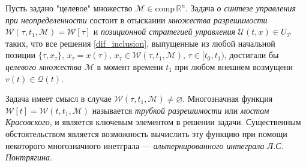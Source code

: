 Пусть задано "целевое" множество \( \mathcal{M} \in \text{comp} \, \mathbb{R}^n \).
Задача \emph{о синтезе управления при неопределенности} состоит в отыскании
 \emph{множества разрешимости} \( \mathcal{W}(\tau, t_1, \mathcal{M}) = 
 \mathcal{W}[\tau] \) и \emph{позиционной стратегией управления}
 \( \mathcal{U}(t,x) \in U_{\mathcal{P}} \) таких, что все решения
 \eqref{dif_inclusion}, выпущенные из любой начальной позиции \( \{\tau, 
 x_{\tau}\}, \, x_{\tau} = x(\tau), \, x_{\tau} \in \mathcal{W}(\tau, t_1, 
 \mathcal{M}), \, \tau \in [t_0, t_1) \), достигали бы \emph{целевого множества}
 \( \mathcal{M} \) в момент времени \( t_1 \) при любом внешнем возмущени
 \( v(t) \in \mathcal{Q}(t) \). 

Задача имеет смысл в случае \( \mathcal{W}(\tau, t_1, \mathcal{M}) \ne 
 \varnothing \). Многозначная функция \( \mathcal{W}[t] = \mathcal{W}(t, 
 t_1,\mathcal{M}) \) называется \emph{трубкой разрешимости} или 
 \emph{мостом Красовского}, и является ключевым элементом в решении задачи.
 Существенным обстоятельством является возможность вычислить эту функцию 
 при помощи некоторого многозначного инетграла --- \emph{альтернированного 
 интеграла Л.С. Понтрягина}.

